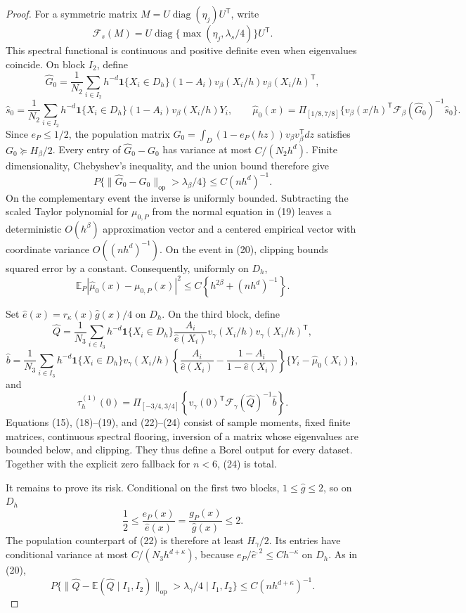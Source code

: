 \documentclass{article}
\begin{document}
\begin{proof}
For a symmetric matrix \(M=U\operatorname{diag}(\eta_j)U^{\mathsf T}\), write
\[
 \mathcal F_s(M)=U\operatorname{diag}\{\max(\eta_j,\lambda_s/4)\}U^{\mathsf T}. \tag{18}
\]
This spectral functional is continuous and positive definite even when eigenvalues coincide.  On block \(I_2\), define
\[
 \widehat G_0=\frac1{N_2}\sum_{i\in I_2}h^{-d}\mathbf1\{X_i\in D_h\}(1-A_i)
 v_\beta(X_i/h)v_\beta(X_i/h)^{\mathsf T},
\]
\[
 \widehat s_0=\frac1{N_2}\sum_{i\in I_2}h^{-d}\mathbf1\{X_i\in D_h\}(1-A_i)v_\beta(X_i/h)Y_i,
 \qquad
 \widehat\mu_0(x)=\Pi_{[1/8,7/8]}\{v_\beta(x/h)^{\mathsf T}\mathcal F_\beta(\widehat G_0)^{-1}\widehat s_0\}. \tag{19}
\]
Since \(e_P\le1/2\), the population matrix \(G_0=\int_D(1-e_P(hz))v_\beta v_\beta^{\mathsf T}dz\) satisfies \(G_0\succeq H_\beta/2\).  Every entry of \(\widehat G_0-G_0\) has variance at most \(C/(N_2h^d)\).  Finite dimensionality, Chebyshev's inequality, and the union bound therefore give
\[
 P\{\lVert\widehat G_0-G_0\rVert_{\mathrm{op}}>\lambda_\beta/4\}
 \le C(nh^d)^{-1}. \tag{20}
\]
On the complementary event the inverse is uniformly bounded.  Subtracting the scaled Taylor polynomial for \(\mu_{0,P}\) from the normal equation in (19) leaves a deterministic \(O(h^\beta)\) approximation vector and a centered empirical vector with coordinate variance \(O((nh^d)^{-1})\).  On the event in (20), clipping bounds squared error by a constant.  Consequently, uniformly on \(D_h\),
\[
 \mathbb E_P|\widehat\mu_0(x)-\mu_{0,P}(x)|^2
 \le C\left\{h^{2\beta}+(nh^d)^{-1}\right\}. \tag{21}
\]

Set \(\widehat e(x)=r_\kappa(x)\widehat g(x)/4\) on \(D_h\).  On the third block, define
\[
 \widehat Q=\frac1{N_3}\sum_{i\in I_3}h^{-d}\mathbf1\{X_i\in D_h\}
 \frac{A_i}{\widehat e(X_i)}v_\gamma(X_i/h)v_\gamma(X_i/h)^{\mathsf T}, \tag{22}
\]
\[
 \widehat b=\frac1{N_3}\sum_{i\in I_3}h^{-d}\mathbf1\{X_i\in D_h\}v_\gamma(X_i/h)
 \left\{\frac{A_i}{\widehat e(X_i)}-\frac{1-A_i}{1-\widehat e(X_i)}\right\}
 \{Y_i-\widehat\mu_0(X_i)\}, \tag{23}
\]
and
\[
 \widehat\tau_h^{(1)}(0)
 =\Pi_{[-3/4,3/4]}\!\left\{v_\gamma(0)^{\mathsf T}
 \mathcal F_\gamma(\widehat Q)^{-1}\widehat b\right\}. \tag{24}
\]
Equations (15), (18)--(19), and (22)--(24) consist of sample moments, fixed finite matrices, continuous spectral flooring, inversion of a matrix whose eigenvalues are bounded below, and clipping.  They thus define a Borel output for every dataset.  Together with the explicit zero fallback for \(n<6\), (24) is total.

It remains to prove its risk.  Conditional on the first two blocks, \(1\le\widehat g\le2\), so on \(D_h\)
\[
 \frac12\le\frac{e_P(x)}{\widehat e(x)}=\frac{g_P(x)}{\widehat g(x)}\le2. \tag{25}
\]
The population counterpart of (22) is therefore at least \(H_\gamma/2\).  Its entries have conditional variance at most \(C/(N_3h^{d+\kappa})\), because \(e_P/\widehat e^{,2}\le Ch^{-\kappa}\) on \(D_h\).  As in (20),
\[
 P\{\lVert\widehat Q-\mathbb E(\widehat Q\mid I_1,I_2)\rVert_{\mathrm{op}}>\lambda_\gamma/4\mid I_1,I_2\}
 \le C(nh^{d+\kappa})^{-1}. \tag{26}
\]


\end{proof}
\end{document}

